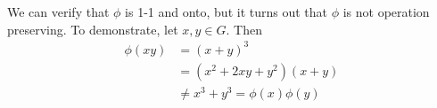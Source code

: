 \documentclass{article} \usepackage{amsmath}
\begin{document}
We can verify that $\phi$ is 1-1 and onto, but it turns out that $\phi$ is not operation
preserving. To demonstrate, let $x,y \in G$. Then
\begin{align*}
\phi(xy) &= (x+y)^{3} \\
&= (x^{2} + 2xy + y^{2})(x+y) \\
&\ne x^{3} + y^{3} = \phi(x)\phi(y)
\end{align*}
\end{document}
